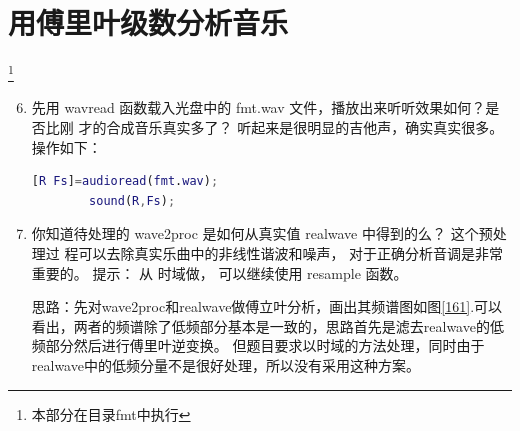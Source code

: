 \documentclass{ctexart}
\begin{document}
\section{用傅里叶级数分析音乐}\footnote{本部分在目录fmt中执行}
\begin{enumerate}\setcounter{enumi}{5}
    \item{先用 wavread 函数载入光盘中的 fmt.wav 文件，播放出来听听效果如何？是否比刚
        才的合成音乐真实多了？}
        听起来是很明显的吉他声，确实真实很多。操作如下：
        \begin{lstlisting}[language=matlab]
        [R Fs]=audioread(fmt.wav);
        sound(R,Fs);
        \end{lstlisting}
    \item{
            你知道待处理的 wave2proc 是如何从真实值 realwave 中得到的么？ 这个预处理过
            程可以去除真实乐曲中的非线性谐波和噪声， 对于正确分析音调是非常重要的。 提示： 从
        时域做， 可以继续使用 resample 函数。}

        思路：先对wave2proc和realwave做傅立叶分析，画出其频谱图如图\ref{161}.可以看出，两者的频谱除了低频部分基本是一致的，思路首先是滤去realwave的低频部分然后进行傅里叶逆变换。
        但题目要求以时域的方法处理，同时由于realwave中的低频分量不是很好处理，所以没有采用这种方案。


\end{enumerate}
\end{document}
